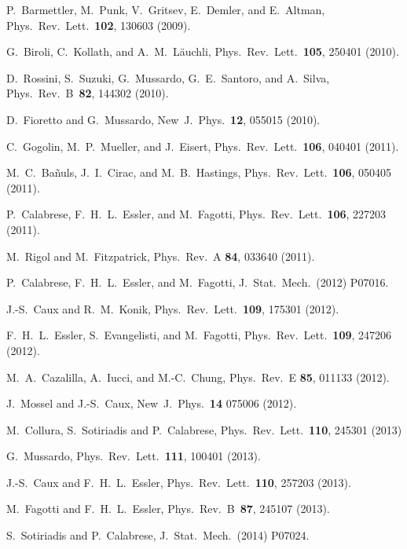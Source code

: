 \documentclass[11pt]{iopart}
\begin{document}
\begin{thebibliography}{99}
P.~Barmettler, M.~Punk, V.~Gritsev, E.~Demler, and E.~Altman, Phys.\ Rev.\ 
Lett.\ {\bf 102}, 130603 (2009).

G.~Biroli, C.~Kollath, and A.~M.~L\"auchli, Phys.\ Rev.\ Lett.\ 
{\bf 105}, 250401 (2010). 

D.~Rossini, S.~Suzuki, G.~Mussardo, G.~E.~Santoro, and A.~Silva, 
Phys.\ Rev.\ B\ {\bf 82}, 144302 (2010).

D.~Fioretto and G.~Mussardo, New\ J.\ Phys.\ {\bf 12}, 
055015 (2010).

C.~Gogolin, M.~P.~Mueller, and J.~Eisert, Phys.\ Rev.\ Lett.\ 
{\bf 106}, 040401 (2011).

\bibitem{banuls-2011}
M.~C.~Ba\~nuls, J.~I.~Cirac, and M.~B.~Hastings, Phys.\ Rev.\ Lett.\ 
{\bf 106}, 050405 (2011). 

P.~Calabrese, F.~H.~L.~Essler, and M.~Fagotti, Phys.\ Rev.\ Lett.\ {\bf106}, 227203 (2011).

M.~Rigol and M.~Fitzpatrick, Phys.\ Rev.\ A {\bf 84}, 033640 (2011).

P.~Calabrese, F.~H.~L.~Essler, and M.~Fagotti, J.\ Stat.\ Mech.\ (2012) P07016.

J.-S.~Caux and R.~M.~Konik, Phys.\ Rev.\ Lett.\ {\bf 109}, 175301 (2012).

F.~H.~L.~Essler, S.~Evangelisti, and M.~Fagotti, Phys.\ Rev.\ Lett.\ 
{\bf 109}, 247206 (2012). 

M.~A.~Cazalilla, A.~Iucci, and M.-C.~Chung, Phys.\ Rev.\ E {\bf 85}, 
011133 (2012). 

J.~Mossel and J.-S.~Caux, New\ J.\ Phys.\ {\bf 14} 075006 (2012).

M.~Collura, S.~Sotiriadis and P.~Calabrese, Phys.\ Rev.\ Lett.\ {\bf 110}, 245301 (2013)

\bibitem{mussardo-2013}
G.~Mussardo, Phys.\ Rev.\ Lett.\ {\bf 111}, 100401 (2013).

\bibitem{caux-2013}
J.-S.~Caux and F.~H.~L.~Essler, Phys.\ Rev.\ Lett.\ {\bf 110}, 
257203 (2013). 

M.~Fagotti and F.~H.~L.~Essler, Phys.\ Rev.\ B\ {\bf87}, 245107 (2013).

S.~Sotiriadis and P.~Calabrese, J.\ Stat.\ Mech.\ (2014) P07024. 


\end{thebibliography}
\end{document}

